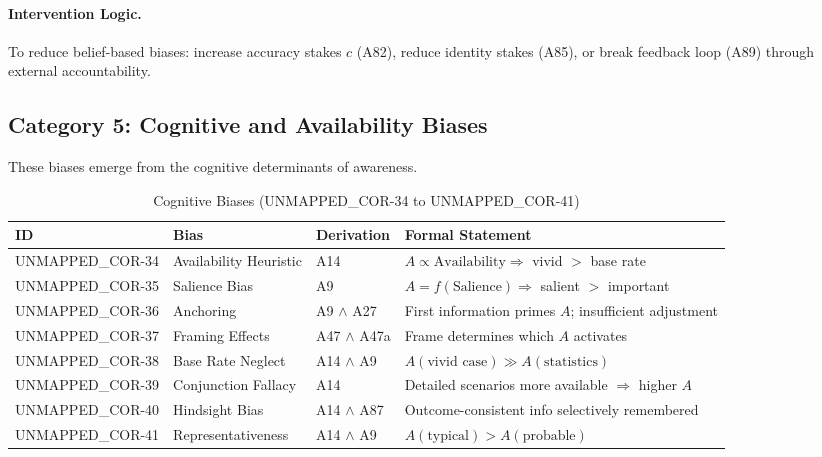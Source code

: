 \paragraph{Intervention Logic.} To reduce belief-based biases: increase accuracy stakes $c$ (A82), reduce identity stakes (A85), or break feedback loop (A89) through external accountability.


\subsection{Category 5: Cognitive and Availability Biases}

These biases emerge from the cognitive determinants of awareness.

\begin{table}[htbp]
\small
\centering
\caption{Cognitive Biases (UNMAPPED_COR-34 to UNMAPPED_COR-41)}
\label{tab:cor-cognitive}
\begin{tabular}{p{1.2cm}p{2.8cm}p{3.8cm}p{5cm}}
\toprule
\textbf{ID} & \textbf{Bias} & \textbf{Derivation} & \textbf{Formal Statement} \\
\midrule
UNMAPPED_COR-34 & Availability Heuristic & A14 & $A \propto \text{Availability} \Rightarrow$ vivid $>$ base rate \\
UNMAPPED_COR-35 & Salience Bias & A9 & $A = f(\text{Salience}) \Rightarrow$ salient $>$ important \\
UNMAPPED_COR-36 & Anchoring & A9 $\land$ A27 & First information primes $A$; insufficient adjustment \\
UNMAPPED_COR-37 & Framing Effects & A47 $\land$ A47a & Frame determines which $A$ activates \\
UNMAPPED_COR-38 & Base Rate Neglect & A14 $\land$ A9 & $A(\text{vivid case}) \gg A(\text{statistics})$ \\
UNMAPPED_COR-39 & Conjunction Fallacy & A14 & Detailed scenarios more available $\Rightarrow$ higher $A$ \\
UNMAPPED_COR-40 & Hindsight Bias & A14 $\land$ A87 & Outcome-consistent info selectively remembered \\
UNMAPPED_COR-41 & Representativeness & A14 $\land$ A9 & $A(\text{typical}) > A(\text{probable})$ \\
\bottomrule
\end{tabular}
\end{table}

